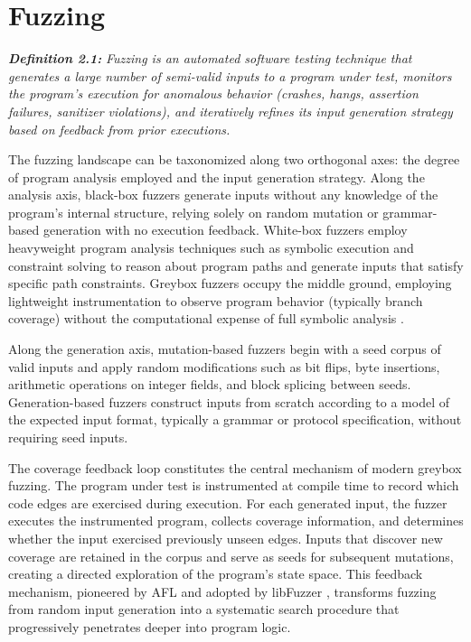\section{Fuzzing}
\label{sec:bg-fuzzing}

\textbf{\textit{Definition 2.1:}} \textit{Fuzzing is an automated software testing technique that generates a large number of semi-valid inputs to a program under test, monitors the program's execution for anomalous behavior (crashes, hangs, assertion failures, sanitizer violations), and iteratively refines its input generation strategy based on feedback from prior executions.}

The fuzzing landscape can be taxonomized along two orthogonal axes: the degree of program analysis employed and the input generation strategy. Along the analysis axis, black-box fuzzers generate inputs without any knowledge of the program's internal structure, relying solely on random mutation or grammar-based generation with no execution feedback. White-box fuzzers employ heavyweight program analysis techniques such as symbolic execution and constraint solving to reason about program paths and generate inputs that satisfy specific path constraints. Greybox fuzzers occupy the middle ground, employing lightweight instrumentation to observe program behavior (typically branch coverage) without the computational expense of full symbolic analysis \cite{fuzzingsurvey}.

Along the generation axis, mutation-based fuzzers begin with a seed corpus of valid inputs and apply random modifications such as bit flips, byte insertions, arithmetic operations on integer fields, and block splicing between seeds. Generation-based fuzzers construct inputs from scratch according to a model of the expected input format, typically a grammar or protocol specification, without requiring seed inputs.

The coverage feedback loop constitutes the central mechanism of modern greybox fuzzing. The program under test is instrumented at compile time to record which code edges are exercised during execution. For each generated input, the fuzzer executes the instrumented program, collects coverage information, and determines whether the input exercised previously unseen edges. Inputs that discover new coverage are retained in the corpus and serve as seeds for subsequent mutations, creating a directed exploration of the program's state space. This feedback mechanism, pioneered by AFL \cite{afl} and adopted by libFuzzer \cite{libfuzzer}, transforms fuzzing from random input generation into a systematic search procedure that progressively penetrates deeper into program logic.

